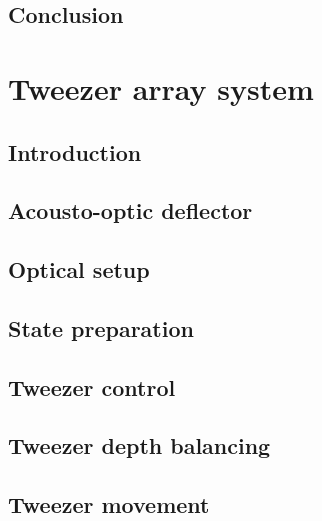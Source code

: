 \documentclass[twoside]{article}
\begin{document}
\subsection{Conclusion} \label{subsec:imaging-conclusion}



\newpage
\section{Tweezer array system} \label{sec:tweezer}

\subsection{Introduction} \label{subsec:state-prepation-overview}


\subsection{Acousto-optic deflector} \label{subsec:aodconcept}

\subsection{Optical setup}

\subsection{State preparation} \label{subsec:state-prepation}

\subsection{Tweezer control} \label{subsec:control}


\subsection{Tweezer depth balancing} \label{subsec:balancing}


\subsection{Tweezer movement} \label{subsec:tweezer-movement}

\end{document}
